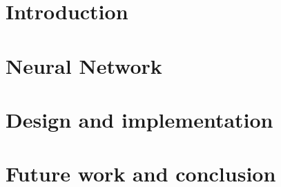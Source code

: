 \documentclass[11pt]{report}
\begin{document}
\maketitle

\tableofcontents

\chapter{Introduction}


\chapter{Neural Network}


\chapter{Design and implementation}


\chapter{Future work and conclusion}


\appendix


\newpage

 

\end{document}
